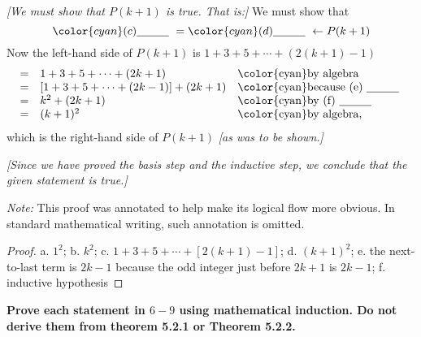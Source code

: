 \documentclass[14pt]{extarticle}
\newcommand{\fbl}{\underline{\hspace{1cm}}\,\,}
\newcommand{\from}{\leftarrow}
\newcommand{\cy}{\color{cyan}}
\begin{document}
{\it [We must show that $P(k + 1)$ is true. That is:]} We must show that
\[
    {\cy (c) \fbl} = {\cy (d) \fbl \from P(k + 1)}
\]
Now the left-hand side of $P(k + 1)$ is $1 + 3 + 5 + \cdots + (2(k + 1) - 1)$
\[
    \begin{array}{lll}
        = & 1 + 3 + 5 + \cdots + (2k + 1)            & \text{\cy by algebra}       \\
        = & [1 + 3 + 5 + \cdots + (2k - 1)] + (2k+1) & \text{\cy because (e) \fbl} \\
        = & k^2 + (2k+1)                             & \text{\cy by (f) \fbl}      \\
        = & (k + 1)^2                                & \text{\cy by algebra,}
    \end{array}
\]
which is the right-hand side of $P(k+1)$ {\it [as was to be shown.]}

    {\it [Since we have proved the basis step and the inductive step, we conclude that the given statement is true.]}

    {\it Note:} This proof was annotated to help make its logical flow more obvious. In standard mathematical writing, such annotation is omitted.

\begin{proof}
    a. $1^2$; b. $k^2$; c. $1 + 3 + 5 + \cdots + [2(k + 1) - 1]$; d. $(k + 1)^2$; e. the next-to-last term is $2k-1$ because the odd integer just before $2k + 1$ is $2k - 1$; f. inductive hypothesis
\end{proof}

{\bf\cy Prove each statement in $6-9$ using mathematical induction. Do not derive them from theorem 5.2.1 or Theorem 5.2.2.}
\end{document}
